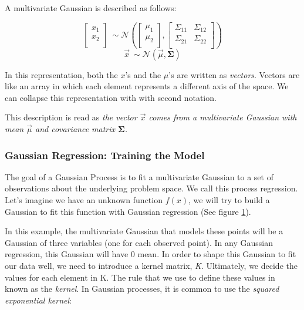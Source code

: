 \documentclass{sig-alternate}
\begin{document}
A multivariate Gaussian is described as follows:

\[\begin{bmatrix}
    x_{1} \\
    x_{2} \\
  \end{bmatrix} 
  ~ \sim \mathcal{N}(
  \begin{bmatrix}
    \mu_{1} \\
    \mu_{2} \\
  \end{bmatrix},
  \begin{bmatrix}
    \Sigma_{11}& \Sigma_{12} \\
    \Sigma_{21}& \Sigma_{22} \\
  \end{bmatrix})\]
\[ \Vec{x} ~ \sim \mathcal{N}(\Vec{\mu}, \mathbf{\Sigma}) \]

In this representation, both the $x$'s and the $\mu$'s are written as \textit{vectors}.
Vectors are like an array in which each element represents a different axis of the space.
We can collapse this representation with with second notation.

This description is read as \textit{the vector $\Vec{x}$ comes from a multivariate Gaussian with mean $\Vec{\mu}$ and covariance matrix $\mathbf{\Sigma}$.}

\subsubsection{Gaussian Regression: Training the Model}

The goal of a Gaussian Process is to fit a multivariate Gaussian to a set of observations about the underlying problem space.
We call this process regression.
Let's imagine we have an unknown function $f(x)$, we will try to build a Gaussian to fit this function with Gaussian regression (See figure \ref{fig:GPRegression}).

\begin{figure}[htb]
\centering
{}
\caption{}
\label{fig:GPRegression}
\end{figure}

In this example, the multivariate Gaussian that models these points will be a Gaussian of three variables (one for each observed point).
In any Gaussian regression, this Gaussian will have 0 mean.
In order to shape this Gaussian to fit our data well, we need to introduce a kernel matrix, \textit{K}.
Ultimately, we decide the values for each element in K.
The rule that we use to define these values in known as the \textit{kernel}.
In Gaussian processes, it is common to use the \textit{squared exponential kernel}:
\end{document}
